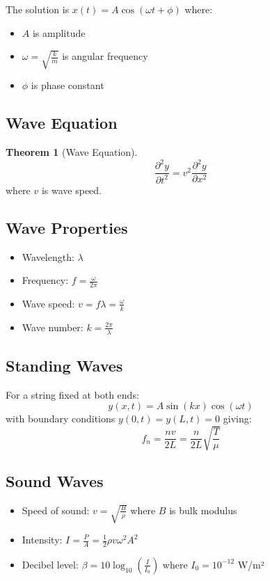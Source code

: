 \documentclass[11pt]{article}
\theoremstyle{definition}
\newtheorem{theorem}{Theorem}[section]
\begin{document}
The solution is $x(t) = A\cos(\omega t + \phi)$ where:
\begin{itemize}
    \item $A$ is amplitude
    \item $\omega = \sqrt{\frac{k}{m}}$ is angular frequency
    \item $\phi$ is phase constant
\end{itemize}

\subsection{Wave Equation}
\begin{theorem}[Wave Equation]
$$\frac{\partial^2 y}{\partial t^2} = v^2 \frac{\partial^2 y}{\partial x^2}$$
where $v$ is wave speed.
\end{theorem}

\subsection{Wave Properties}
\begin{itemize}
    \item Wavelength: $\lambda$
    \item Frequency: $f = \frac{\omega}{2\pi}$
    \item Wave speed: $v = f\lambda = \frac{\omega}{k}$
    \item Wave number: $k = \frac{2\pi}{\lambda}$
\end{itemize}

\subsection{Standing Waves}
For a string fixed at both ends:
$$y(x,t) = A\sin(kx)\cos(\omega t)$$
with boundary conditions $y(0,t) = y(L,t) = 0$ giving:
$$f_n = \frac{nv}{2L} = \frac{n}{2L}\sqrt{\frac{T}{\mu}}$$

\subsection{Sound Waves}
\begin{itemize}
    \item Speed of sound: $v = \sqrt{\frac{B}{\rho}}$ where $B$ is bulk modulus
    \item Intensity: $I = \frac{P}{A} = \frac{1}{2}\rho v \omega^2 A^2$
    \item Decibel level: $\beta = 10 \log_{10}\left(\frac{I}{I_0}\right)$ where $I_0 = 10^{-12}$ W/m²
\end{itemize}
\end{document}
